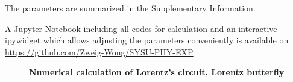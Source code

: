\documentclass[10pt,a4paper,twocolumn,twoside,UTF8]{article}
\begin{document}
		The parameters are summarized in the Supplementary Information.

		A Jupyter Notebook including all codes for calculation and an interactive ipywidget which allows adjusting the parameters conveniently is available on \href{https://github.com/Zweig-Wong/SYSU-PHY-EXP/blob/main/C9-Chaotic_circuit/Lorentz/Calculation/Lorentz.ipynb}{https://github.com/Zweig-Wong/SYSU-PHY-EXP}
		\begin{figure}[htbp]
			\centering
			
			\caption{\textbf{Numerical calculation of Lorentz's circuit, Lorentz butterfly}}
			\label{fig.4.1}
		\end{figure}
\end{document}
